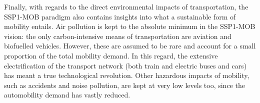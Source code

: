 Finally, with regards to the direct environmental impacts of transportation, the SSP1-MOB paradigm also contains insights into what a sustainable form of mobility entails. Air pollution is kept to the absolute minimum in the SSP1-MOB vision: the only carbon-intensive means of transportation are aviation and biofuelled vehicles. However, these are assumed to be rare and account for a small proportion of the total mobility demand. In this regard, the extensive electrification of the transport network (both train and electric buses and cars) has meant a true technological revolution. Other hazardous impacts of mobility, such as accidents and noise pollution, are kept at very low levels too, since the automobility demand has vastly reduced.